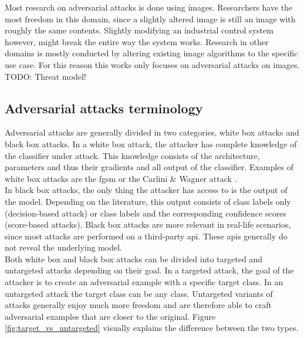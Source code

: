 Most research on adversarial attacks is done using images. Researchers have the most freedom in this domain, since a slightly altered image is still an image with roughly the same contents. Slightly modifying an industrial control system however, might break the entire way the system works. Research in other domains is mostly conducted by altering existing image algorithms to the specific use case. For this reason this works only focuses on adversarial attacks on images.\\ 

TODO: Threat model!

\subsection{Adversarial attacks terminology}
Adversarial attacks are generally divided in two categories, white box attacks and black box attacks. In a white box attack, the attacker has complete knowledge of the classifier under attack. This knowledge consists of the architecture, parameters and thus their gradients and all output of the classifier. Examples of white box attacks are the \gls{fgsm} \cite{FGSM} or the Carlini \& Wagner attack \cite{cw_attack}.\\

In black box attacks, the only thing the attacker has access to is the output of the model. Depending on the literature, this output consists of class labels only (decision-based attack) or class labels and the corresponding confidence scores (score-based attacks). Black box attacks are more relevant in real-life scenarios, since most attacks are performed on a third-party \gls{api}. These \glspl{api} generally do not reveal the underlying model.\\

Both white box and black box attacks can be divided into targeted and untargeted attacks depending on their goal. In a targeted attack, the goal of the attacker is to create an adversarial example with a specific target class. In an untargeted attack the target class can be any class. Untargeted variants of attacks generally enjoy much more freedom and are therefore able to craft adversarial examples that are closer to the original. Figure \ref{fig:target_vs_untargeted} visually explains the difference between the two types.\\


